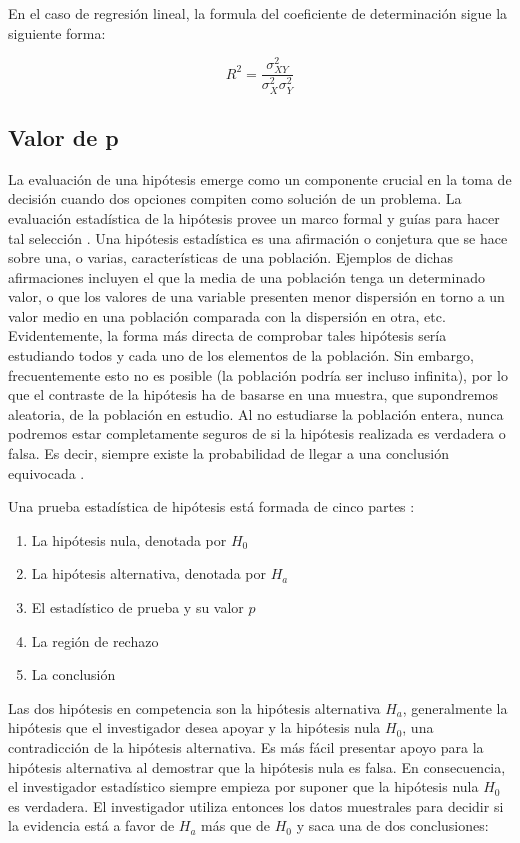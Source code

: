 En el caso de regresión lineal, la formula del coeficiente de determinación sigue la siguiente forma:

\begin{equation}
    R^{2} = \frac{\sigma^{2}_{XY}}{\sigma^{2}_{X}\sigma^{2}_{Y}}    
\end{equation}

\subsection{Valor de p}
La evaluación de una hipótesis emerge como un componente crucial en la toma de decisión cuando dos opciones compiten como solución de un problema. La evaluación estadística de la hipótesis provee un marco formal y guías para hacer tal selección \cite{thinkStats}. Una hipótesis estadística es una afirmación o conjetura que se hace sobre una, o varias, características de una población. Ejemplos de dichas afirmaciones incluyen el que la media de una población tenga un determinado valor, o que los valores de una variable presenten menor dispersión en torno a un valor medio en una población comparada con la dispersión en otra, etc. Evidentemente, la forma más directa de comprobar tales hipótesis sería estudiando todos y cada uno de los elementos de la población. Sin embargo, frecuentemente esto no es posible (la población podría ser incluso infinita), por lo que el contraste de la hipótesis ha de basarse en una muestra, que supondremos aleatoria, de la población en estudio. Al no estudiarse la población entera, nunca podremos estar completamente seguros de si la hipótesis realizada es verdadera o falsa. Es decir, siempre existe la probabilidad de llegar a una conclusión equivocada \cite{estadisticaBasica}.

Una prueba estadística de hipótesis está formada de cinco partes \cite{mendehall}:

\begin{enumerate}
    \item La hipótesis nula, denotada por $H_0$
    \item La hipótesis alternativa, denotada por $H_a$
    \item El estadístico de prueba y su valor $p$
    \item La región de rechazo
    \item La conclusión
\end{enumerate}

Las dos hipótesis en competencia son la hipótesis alternativa $H_a$, generalmente la hipótesis que el investigador desea apoyar y la hipótesis nula $H_0$, una contradicción de la hipótesis alternativa. Es más fácil presentar apoyo para la hipótesis alternativa al demostrar que la hipótesis nula es falsa. En consecuencia, el investigador estadístico siempre empieza por suponer que la hipótesis nula $H_0$ es verdadera. El investigador utiliza entonces los datos muestrales para decidir si la evidencia está a favor de $H_a$ más que de $H_0$ y saca una de dos conclusiones:

